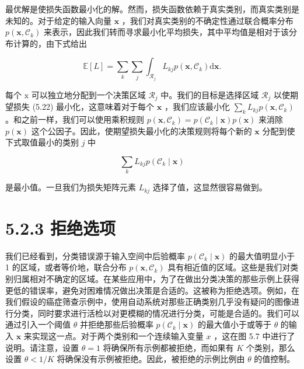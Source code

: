 \documentclass[10pt]{report}
\begin{document}
\begin{center}
\end{center}

最优解是使损失函数最小化的解。然而，损失函数依赖于真实类别，而真实类别是未知的。对于给定的输入向量 \(\mathbf{x}\) ，我们对真实类别的不确定性通过联合概率分布 \(p\left( {\mathbf{x},{\mathcal{C}}_{k}}\right)\) 来表示，因此我们转而寻求最小化平均损失，其中平均值是相对于该分布计算的，由下式给出

\[
\mathbb{E}\left\lbrack  L\right\rbrack   = \mathop{\sum }\limits_{k}\mathop{\sum }\limits_{j}{\int }_{{\mathcal{R}}_{j}}{L}_{kj}p\left( {\mathbf{x},{\mathcal{C}}_{k}}\right) \mathrm{d}\mathbf{x}. \tag{5.22}
\]

每个 \(\mathrm{x}\) 可以独立地分配到一个决策区域 \({\mathcal{R}}_{j}\) 中。我们的目标是选择区域 \({\mathcal{R}}_{j}\) 以使期望损失 (5.22) 最小化，这意味着对于每个 \(\mathbf{x}\) ，我们应该最小化 \(\mathop{\sum }\limits_{k}{L}_{kj}p\left( {\mathbf{x},{\mathcal{C}}_{k}}\right)\) 。和之前一样，我们可以使用乘积规则 \(p\left( {\mathbf{x},{\mathcal{C}}_{k}}\right)  = p\left( {{\mathcal{C}}_{k} \mid  \mathbf{x}}\right) p\left( \mathbf{x}\right)\) 来消除 \(p\left( \mathbf{x}\right)\) 这个公因子。因此，使期望损失最小化的决策规则将每个新的 \(\mathbf{x}\) 分配到使下式取值最小的类别 \(j\) 中

\[
\mathop{\sum }\limits_{k}{L}_{kj}p\left( {{\mathcal{C}}_{k} \mid  \mathbf{x}}\right)  \tag{5.23}
\]

是最小值。一旦我们为损失矩阵元素 \({L}_{kj}\) 选择了值，这显然很容易做到。

\section*{5.2.3 拒绝选项}

我们已经看到，分类错误源于输入空间中后验概率 \(p\left( {{\mathcal{C}}_{k} \mid  \mathbf{x}}\right)\) 的最大值明显小于 1 的区域，或者等价地，联合分布 \(p\left( {\mathbf{x},{\mathcal{C}}_{k}}\right)\) 具有相近值的区域。这些是我们对类别归属相对不确定的区域。在某些应用中，为了在做出分类决策的那些示例上获得更低的错误率，避免对困难情况做出决策是合适的。这被称为拒绝选项。例如，在我们假设的癌症筛查示例中，使用自动系统对那些正确类别几乎没有疑问的图像进行分类，同时要求进行活检以对更模糊的情况进行分类，可能是合适的。我们可以通过引入一个阈值 \(\theta\) 并拒绝那些后验概率 \(p\left( {{\mathcal{C}}_{k} \mid  \mathbf{x}}\right)\) 的最大值小于或等于 \(\theta\) 的输入 \(\mathbf{x}\) 来实现这一点。对于两个类别和一个连续输入变量 \(x\) ，这在图 5.7 中进行了说明。请注意，设置 \(\theta  = 1\) 将确保所有示例都被拒绝，而如果有 \(K\) 个类别，那么设置 \(\theta  < 1/K\) 将确保没有示例被拒绝。因此，被拒绝的示例比例由 \(\theta\) 的值控制。
\end{document}
